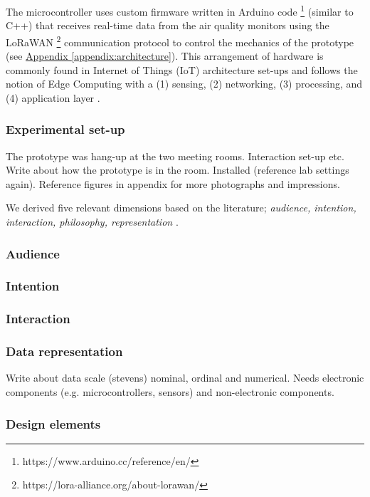 The microcontroller uses custom firmware written in Arduino code \footnote{https://www.arduino.cc/reference/en/} (similar to C++) that receives real-time data from the air quality monitors using the LoRaWAN \footnote{https://lora-alliance.org/about-lorawan/} communication protocol to control the mechanics of the prototype (see \hyperref[appendix:architecture]{Appendix \ref*{appendix:architecture}}). This arrangement of hardware is commonly found in Internet of Things (IoT) architecture set-ups and follows the notion of Edge Computing with a (1) sensing, (2) networking, (3) processing, and (4) application layer \cite{li_edge-oriented_2019, idrees_edge_2018}.

\subsubsection{Experimental set-up}

The prototype was hang-up at the two meeting rooms. Interaction set-up etc. Write about how the prototype is in the room. Installed (reference lab settings again). Reference figures in appendix for more photographs and impressions.

We derived five relevant dimensions based on the literature; \textit{audience, intention, interaction, philosophy, representation} \cite{sauve_physecology_2022, hornecker_design_2023}.

\subsubsection{Audience}

\subsubsection{Intention}

\subsubsection{Interaction}

\subsubsection{Data representation}

Write about data scale (stevens) nominal, ordinal and numerical. Needs electronic components (e.g. microcontrollers, sensors) and non-electronic components.

\subsubsection{Design elements}

